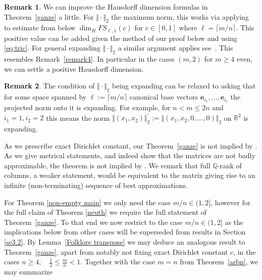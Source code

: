 \documentclass[10pt]{amsart}
\theoremstyle{definition}
\newtheorem{remark}{Remark}
\newcommand{\R}{\mathbb{R}}
\newcommand{\Q}{\mathbb{Q}}
\begin{document}
\begin{remark}
    We can improve the Hausdorff dimension
formulas in Theorem~\ref{ganze} a little. For
$\Vert\cdot\Vert_2$ the maximum norm, this works via applying~\cite[Theorem~3.1]{j1}
to estimate from below $\dim_H FS_{\ell,1}(c)$
for $c\in [0,1]$ where
$\ell=\lceil m/n\rceil$. This positive value can be added given the method of our proof below and using \eqref{eq:tric}. For 
general expanding $\Vert\cdot\Vert_2$ a similar argument applies
see~\cite[Remark~2]{j1}. 
This resembles Remark~\ref{remark4}.
    In particular in the cases $(m,2)$ for $m\ge 4$ even, we can settle a positive Hausdorff dimension.
\end{remark}

\begin{remark}
    The condition of $\Vert \cdot \Vert_2$
    being expanding can be relaxed to asking that for some space spanned
    by $\ell:=\lceil m/n\rceil$ canonical base vectors
    $\textbf{e}_{i_1},\ldots, \textbf{e}_{i_{\ell} }$
    the projected norm onto it is expanding. For example, for 
    $n<m\le 2n$ and
    $i_1=1, i_2=2$ this means the norm
    $\Vert (x_1,x_2)\Vert_{2}^{\prime}:=\Vert (x_1,x_2,0,\ldots,0)\Vert_2$ on $\R^2$ is expanding.
\end{remark}


As we prescribe exact Dirichlet constant, our Theorem~\ref{ganze} is not implied by \cite{Dasetal}. As we give metrical statements, and indeed show that the matrices are not badly approximable, the theorem is not implied by \cite{AginWeiss2024}. We remark that full $\Q$-rank of columns, a weaker statement, would be equivalent to the matrix giving rise to an infinite (non-terminating) sequence of best approximations. 

For Theorem \ref{non-empty main} we only need the case $m/n\in (1, 2]$, however for the full claim of Theorem \ref{neuth} we require the full statement of Theorem~\ref{ganze}. To that end we now restrict to the case $m/n\in (1,2]$ as the implications below from other cases will be superseded
from results in Section \ref{se3.2}.
By Lemma~\ref{Folklore transpose} we may deduce an analogous result to Theorem~\ref{ganze}, apart from notably not fixing exact Dirichlet constant $c$, in the cases $n\ge 4,\quad  \tfrac{1}{2} \le \tfrac{m}{n} < 1$. Together with the case $m=n$ from
Theorem~\ref{arbn}, we may summarize
\end{document}

